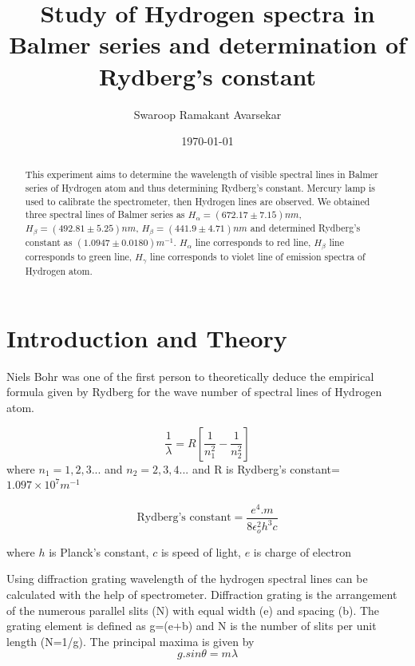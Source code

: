 \documentclass[a4paper, amsfonts, amssymb, amsmath, reprint, showkeys, nofootinbib, twoside]{revtex4-1}
\begin{document}
\title{Study of Hydrogen spectra in Balmer series and determination of Rydberg's constant}
\author{Swaroop Ramakant Avarsekar}
\date{\today}

	
\begin{abstract}
This experiment aims to determine the wavelength of visible spectral lines in Balmer series of Hydrogen atom and thus determining Rydberg's constant. Mercury lamp is used to calibrate the spectrometer, then Hydrogen lines are observed. We obtained three spectral lines of Balmer series as $H_\alpha=(672.17\pm7.15) nm$, $H_\beta=(492.81\pm5.25) nm$, $H_\beta=(441.9\pm4.71) nm$ and determined Rydberg's constant as $(1.0947\pm0.0180) m^{-1}$.  $H_\alpha$ line corresponds to red line, $H_\beta$ line corresponds to green line,
$H_\gamma$ line corresponds to violet line of emission spectra of Hydrogen atom. 
\end{abstract}
	
	
\maketitle

\section{Introduction and Theory}
Niels Bohr was one of the first person to theoretically deduce the empirical formula given by Rydberg for the wave number of spectral lines of Hydrogen atom. 

\begin{equation}
	\frac{1}{\lambda}=R\left[ \frac{1}{n_1^2}-\frac{1}{n_2^2}\right] 
\end{equation}
where $n_1=1, 2, 3...$ and $n_2=2, 3, 4...$ and R is Rydberg's constant=$1.097\times10^7 m^{-1}$

$$\text{Rydberg's constant}=\frac{e^4.m}{8\epsilon_o^2h^3c}$$

where $h$ is Planck's constant, $c$ is speed of light, $e$ is charge of electron

Using diffraction grating wavelength of the hydrogen spectral lines can be calculated with the help of spectrometer. Diffraction grating is the arrangement of the numerous parallel slits (N) with equal width (e) and spacing (b). The grating element is defined as g=(e+b) and N is the number of slits per unit length (N=1/g). The principal maxima is given by 
\begin{equation}
	g.sin \theta=m \lambda
\end{equation}
\end{document}
